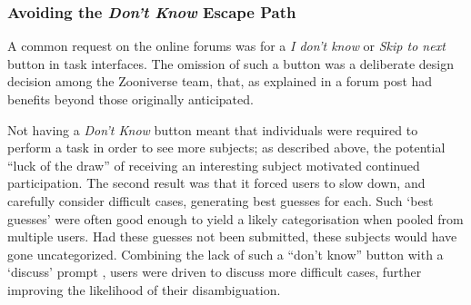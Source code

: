 \documentclass{sigchi}
\begin{document}


\subsubsection{Avoiding the \emph{Don't Know} Escape Path}
A common request on the online forums was for a \emph{I don't know} or \emph{Skip to next} button in task interfaces.  The omission of such a button was a deliberate design decision among the Zooniverse team, that, as explained in a forum post\cite{zooniverseblog} had benefits beyond those  originally anticipated.

Not having a \emph{Don't Know} button meant that individuals were required to perform a task in order to see more subjects; as described above, the  potential ``luck of the draw'' of receiving an interesting subject motivated continued participation.  The second result was that it forced users to slow down, and carefully consider difficult cases, generating best guesses for each.  Such `best guesses' were often good enough to yield a likely categorisation when pooled from multiple users.  Had these guesses not been submitted, these subjects would have gone uncategorized.  Combining the lack of such a ``don't know'' button with a  `discuss' prompt , users were driven to discuss more difficult cases, further improving the likelihood of their disambiguation.  %
\end{document}
